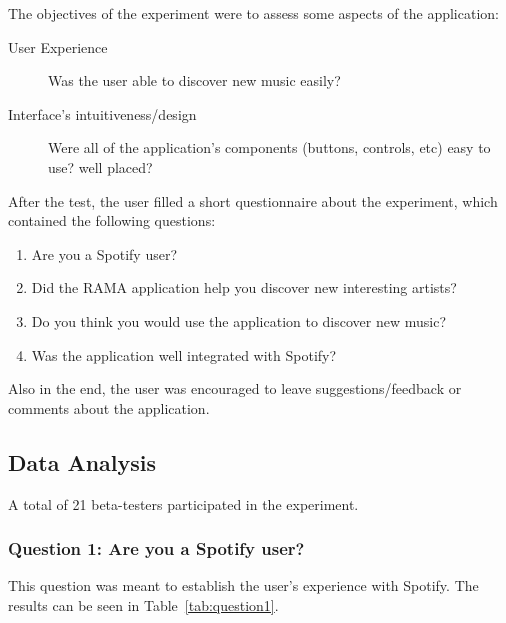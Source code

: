     The objectives of the experiment were to assess some aspects of the application:

    \begin{description}
      \item[User Experience]
        Was the user able to discover new music easily?
      \item[Interface's intuitiveness/design]
        Were all of the application's components (buttons, controls, etc) easy to use? well placed?
    \end{description}

    After the test, the user filled a short questionnaire about the experiment, which contained the following questions:

    \begin{enumerate}
      \item Are you a Spotify user?
      \item Did the RAMA application help you discover new interesting artists?
      \item Do you think you would use the application to discover new music?
      \item Was the application well integrated with Spotify?
    \end{enumerate}

    Also in the end, the user was encouraged to leave suggestions/feedback or comments about the application.



  \subsection{Data Analysis} %
  \label{sub:data_analysis}

    A total of 21 beta-testers participated in the experiment.

    \subsubsection{Question 1: Are you a Spotify user?} %
    \label{ssub:question_1}

      This question was meant to establish the user's experience with Spotify.
      The results can be seen in Table~\ref{tab:question1}.

